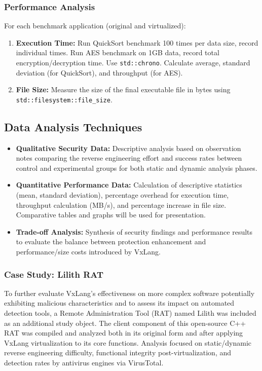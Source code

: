 \subsubsection{Performance Analysis}
For each benchmark application (original and virtualized):
    \begin{enumerate}
        \item \textbf{Execution Time:} Run QuickSort benchmark 100 times per data size, record individual times. Run AES benchmark on 1GB data, record total encryption/decryption time. Use \texttt{std::chrono}. Calculate average, standard deviation (for QuickSort), and throughput (for AES).
        \item \textbf{File Size:} Measure the size of the final executable file in bytes using \texttt{std::filesystem::file\_size}.
    \end{enumerate}

\subsection{Data Analysis Techniques}
\begin{itemize}
    \item \textbf{Qualitative Security Data:} Descriptive analysis based on observation notes comparing the reverse engineering effort and success rates between control and experimental groups for both static and dynamic analysis phases.
    \item \textbf{Quantitative Performance Data:} Calculation of descriptive statistics (mean, standard deviation), percentage overhead for execution time, throughput calculation (MB/s), and percentage increase in file size. Comparative tables and graphs will be used for presentation.
    \item \textbf{Trade-off Analysis:} Synthesis of security findings and performance results to evaluate the balance between protection enhancement and performance/size costs introduced by VxLang.
\end{itemize}

\subsubsection{Case Study: Lilith RAT}
To further evaluate VxLang's effectiveness on more complex software potentially exhibiting malicious characteristics and to assess its impact on automated detection tools, a Remote Administration Tool (RAT) named Lilith \cite{LilithRAT} was included as an additional study object. The client component of this open-source C++ RAT was compiled and analyzed both in its original form and after applying VxLang virtualization to its core functions. Analysis focused on static/dynamic reverse engineering difficulty, functional integrity post-virtualization, and detection rates by antivirus engines via VirusTotal.
